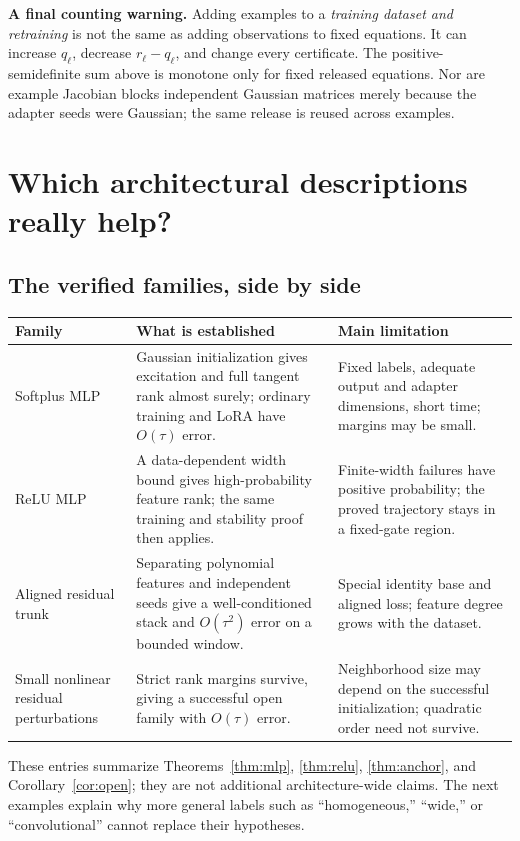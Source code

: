 \documentclass[12pt,a4paper]{article}
\theoremstyle{readable}
\theoremstyle{definition}\newtheorem{example}[theorem]{Example}
\begin{document}
\textbf{A final counting warning.} Adding examples to a \emph{training dataset and retraining} is not the same as adding observations to fixed equations. It can increase \(q_\ell\), decrease \(r_\ell-q_\ell\), and change every certificate. The positive-semidefinite sum above is monotone only for fixed released equations. Nor are example Jacobian blocks independent Gaussian matrices merely because the adapter seeds were Gaussian; the same release is reused across examples.

\section{Which architectural descriptions really help?}
\label{sec:architectures}

\subsection{The verified families, side by side}
\begin{center}
\begin{tabular}{@{}>{\raggedright\arraybackslash}p{35mm}>{\raggedright\arraybackslash}p{54mm}>{\raggedright\arraybackslash}p{54mm}@{}}
\toprule Family & What is established & Main limitation\\\midrule
Softplus MLP & Gaussian initialization gives excitation and full tangent rank almost surely; ordinary training and LoRA have \(O(\tau)\) error. & Fixed labels, adequate output and adapter dimensions, short time; margins may be small.\\
ReLU MLP & A data-dependent width bound gives high-probability feature rank; the same training and stability proof then applies. & Finite-width failures have positive probability; the proved trajectory stays in a fixed-gate region.\\
Aligned residual trunk & Separating polynomial features and independent seeds give a well-conditioned stack and \(O(\tau^2)\) error on a bounded window. & Special identity base and aligned loss; feature degree grows with the dataset.\\
Small nonlinear residual perturbations & Strict rank margins survive, giving a successful open family with \(O(\tau)\) error. & Neighborhood size may depend on the successful initialization; quadratic order need not survive.\\\bottomrule
\end{tabular}
\end{center}
These entries summarize Theorems~\ref{thm:mlp}, \ref{thm:relu}, \ref{thm:anchor}, and Corollary~\ref{cor:open}; they are not additional architecture-wide claims. The next examples explain why more general labels such as ``homogeneous,'' ``wide,'' or ``convolutional'' cannot replace their hypotheses.
\end{document}
